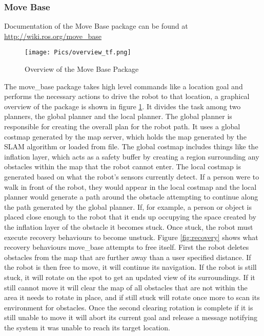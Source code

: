 \subsubsection{Move Base}

Documentation of the Move Base package can be found at \url{http://wiki.ros.org/move_base}\\

\begin{figure}[H]
    \centering
    \texttt{[image: Pics/overview\_tf.png]}
    \caption{Overview of the Move Base Package \cite{rosmovebase}}
    \label{fig:movebaseoverview}
\end{figure}

The move\_base package takes high level commands like a location goal and performs the necessary actions to drive the robot to that location, a graphical overview of the package is shown in figure \ref{fig:movebaseoverview}. It divides the task among two planners, the global planner and the local planner. The global planner is responsible for creating the overall plan for the robot path. It uses a global costmap generated by the map server, which holds the map generated by the SLAM algorithm or loaded from file. The global costmap includes things like the inflation layer, which acts as a safety buffer by creating a region surrounding any obstacles within the map that the robot cannot enter. The local costmap is generated based on what the robot's sensors currently detect. If a person were to walk in front of the robot, they would appear in the local costmap and the local planner would generate a path around the obstacle attempting to continue along the path generated by the global planner. If, for example, a person or object is placed close enough to the robot that it ends up occupying the space created by the inflation layer of the obstacle it becomes stuck. Once stuck, the robot must execute recovery behaviours to become unstuck. Figure \ref{fig:recovery} shows what recovery behaviours move\_base attempts to free itself. First the robot deletes obstacles from the map that are further away than a user specified distance. If the robot is then free to move, it will continue its navigation. If the robot is still stuck, it will rotate on the spot to get an updated view of its surroundings. If it still cannot move it will clear the map of all obstacles that are not within the area it needs to rotate in place, and if still stuck will rotate once more to scan its environment for obstacles. Once the second clearing rotation is complete if it is still unable to move it will abort its current goal and release a message notifying the system it was unable to reach its target location.\\

